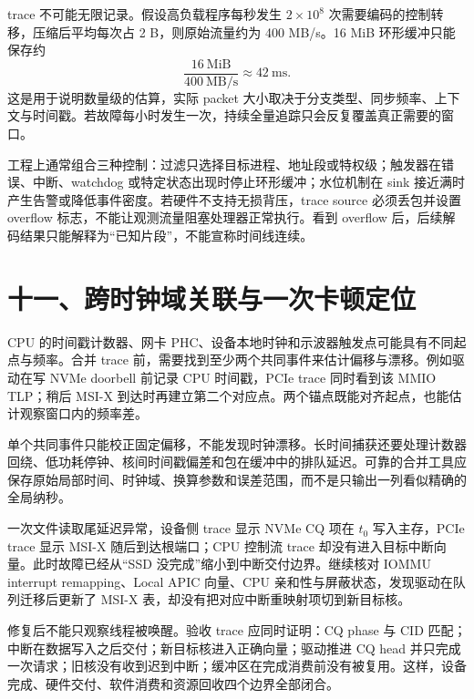 trace 不可能无限记录。假设高负载程序每秒发生 $2\times10^8$ 次需要编码的控制转移，压缩后平均每次占 2 B，则原始流量约为 400 MB/s。16 MiB 环形缓冲只能保存约
\[
  \frac{16\ \mathrm{MiB}}{400\ \mathrm{MB/s}} \approx 42\ \mathrm{ms}.
\]
这是用于说明数量级的估算，实际 packet 大小取决于分支类型、同步频率、上下文与时间戳。若故障每小时发生一次，持续全量追踪只会反复覆盖真正需要的窗口。

工程上通常组合三种控制：过滤只选择目标进程、地址段或特权级；触发器在错误、中断、watchdog 或特定状态出现时停止环形缓冲；水位机制在 sink 接近满时产生告警或降低事件密度。若硬件不支持无损背压，trace source 必须丢包并设置 overflow 标志，不能让观测流量阻塞处理器正常执行。看到 overflow 后，后续解码结果只能解释为“已知片段”，不能宣称时间线连续。

\section{十一、跨时钟域关联与一次卡顿定位}

CPU 的时间戳计数器、网卡 PHC、设备本地时钟和示波器触发点可能具有不同起点与频率。合并 trace 前，需要找到至少两个共同事件来估计偏移与漂移。例如驱动在写 NVMe doorbell 前记录 CPU 时间戳，PCIe trace 同时看到该 MMIO TLP；稍后 MSI-X 到达时再建立第二个对应点。两个锚点既能对齐起点，也能估计观察窗口内的频率差。

单个共同事件只能校正固定偏移，不能发现时钟漂移。长时间捕获还要处理计数器回绕、低功耗停钟、核间时间戳偏差和包在缓冲中的排队延迟。可靠的合并工具应保存原始局部时间、时钟域、换算参数和误差范围，而不是只输出一列看似精确的全局纳秒。


一次文件读取尾延迟异常，设备侧 trace 显示 NVMe CQ 项在 $t_0$ 写入主存，PCIe trace 显示 MSI-X 随后到达根端口；CPU 控制流 trace 却没有进入目标中断向量。此时故障已经从“SSD 没完成”缩小到中断交付边界。继续核对 IOMMU interrupt remapping、Local APIC 向量、CPU 亲和性与屏蔽状态，发现驱动在队列迁移后更新了 MSI-X 表，却没有把对应中断重映射项切到新目标核。

修复后不能只观察线程被唤醒。验收 trace 应同时证明：CQ phase 与 CID 匹配；中断在数据写入之后交付；新目标核进入正确向量；驱动推进 CQ head 并只完成一次请求；旧核没有收到迟到中断；缓冲区在完成消费前没有被复用。这样，设备完成、硬件交付、软件消费和资源回收四个边界全部闭合。


